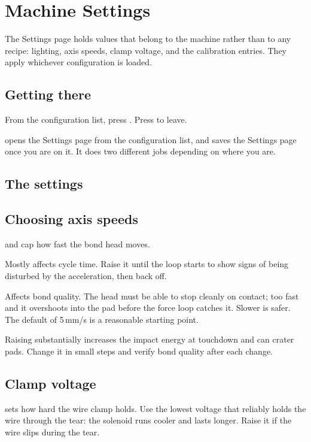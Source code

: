 \chapter{Machine Settings}
\label{ch:settings}

The Settings page holds values that belong to the machine rather than to any
recipe: lighting, axis speeds, clamp voltage, and the calibration entries.
They apply whichever configuration is loaded.

\section{Getting there}

From the configuration list, press . Press  to
leave.

\begin{wbnote}
 opens the Settings page from the configuration list, and saves
the Settings page once you are on it. It does two different jobs depending on
where you are.
\end{wbnote}

\section{The settings}



\section{Choosing axis speeds}

 and  cap how fast the bond head
moves.

\begin{description}[leftmargin=!,labelwidth=30mm,style=nextline,font=\normalfont\ttfamily]
\item[Up Speed] Mostly affects cycle time. Raise it until the loop starts to
  show signs of being disturbed by the acceleration, then back off.
\item[Down Speed] Affects bond quality. The head must be able to stop cleanly
  on contact; too fast and it overshoots into the pad before the force loop
  catches it. Slower is safer. The default of 5\,mm/s is a reasonable starting
  point.
\end{description}

\begin{wbwarning}
Raising  substantially increases the impact energy at
touchdown and can crater pads. Change it in small steps and verify bond quality
after each change.
\end{wbwarning}

\section{Clamp voltage}

 sets how hard the wire clamp holds. Use the lowest
voltage that reliably holds the wire through the tear: the solenoid runs cooler
and lasts longer. Raise it if the wire slips during the tear.
